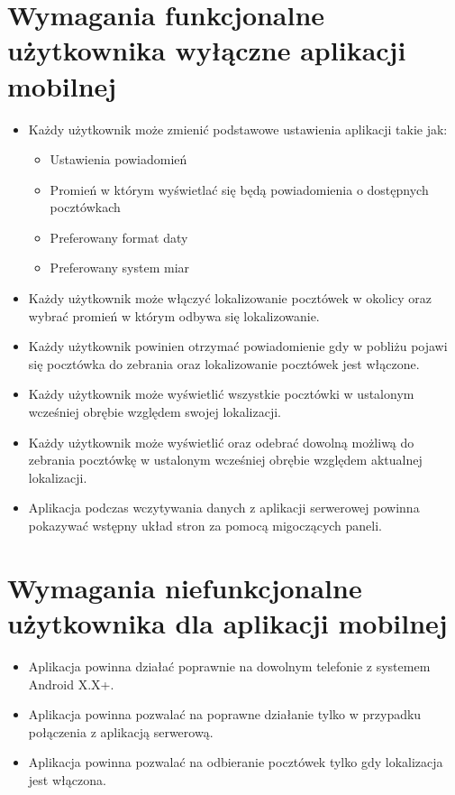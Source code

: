 \documentclass[a4paper,twoside,12pt]{book}
\begin{document}
\section{Wymagania funkcjonalne użytkownika wyłączne aplikacji mobilnej}
\begin{itemize}
    \item Każdy użytkownik może zmienić podstawowe ustawienia aplikacji takie jak:
    \begin{itemize}
        \item Ustawienia powiadomień
        \item Promień w którym wyświetlać się będą powiadomienia o dostępnych pocztówkach
        \item Preferowany format daty
        \item Preferowany system miar
    \end{itemize}
    \item Każdy użytkownik może włączyć lokalizowanie pocztówek w okolicy oraz wybrać promień w którym odbywa się lokalizowanie.
    \item Każdy użytkownik powinien otrzymać powiadomienie gdy w pobliżu pojawi się pocztówka do zebrania oraz lokalizowanie pocztówek jest włączone.
    \item Każdy użytkownik może wyświetlić wszystkie pocztówki w ustalonym wcześniej obrębie względem swojej lokalizacji.
    \item Każdy użytkownik może wyświetlić oraz odebrać dowolną możliwą do zebrania pocztówkę w ustalonym wcześniej obrębie względem aktualnej lokalizacji.
    \item Aplikacja podczas wczytywania danych z aplikacji serwerowej powinna pokazywać wstępny układ stron za pomocą migoczących paneli.
\end{itemize}

\section{Wymagania niefunkcjonalne użytkownika dla aplikacji mobilnej}
\begin{itemize}
    \item Aplikacja powinna działać poprawnie na dowolnym telefonie z systemem Android X.X+.
    \item Aplikacja powinna pozwalać na poprawne działanie tylko w przypadku połączenia z aplikacją serwerową.
    \item Aplikacja powinna pozwalać na odbieranie pocztówek tylko gdy lokalizacja jest włączona.
\end{itemize}
\end{document}

